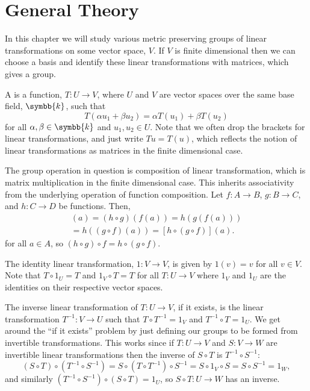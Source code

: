 \documentclass[fleqn]{NotesClass}
\newcommand{\ident}{1}
\renewcommand{\field}{\symbb{k}}
\begin{document}
    \section{General Theory}
    In this chapter we will study various metric preserving groups of linear transformations on some vector space, \(V\).
    If \(V\) is finite dimensional then we can choose a basis and identify these linear transformations with matrices, which gives a group.
    
    A  is a function, \(T \colon U \to V\), where \(U\) and \(V\) are vector spaces over the same base field, \(\field\), such that
    \begin{equation}
        T(\alpha u_1 + \beta u_2) = \alpha T(u_1) + \beta T(u_2)
    \end{equation}
    for all \(\alpha, \beta \in \field\) and \(u_1, u_2 \in U\).
    Note that we often drop the brackets for linear transformations, and just write \(Tu = T(u)\), which reflects the notion of linear transformations as matrices in the finite dimensional case.
    
    The group operation in question is composition of linear transformation, which is matrix multiplication in the finite dimensional case.
    This inherits associativity from the underlying operation of function composition.
    Let \(f \colon A \to B\), \(g \colon B \to C\), and \(h \colon C \to D\) be functions.
    Then,
    \begin{multline}
        [(h \circ g) \circ f](a) = (h \circ g)(f(a)) = h(g(f(a)))\\
        = h((g \circ f)(a)) = [h \circ (g \circ f)](a).
    \end{multline}
    for all \(a \in A\), so \((h \circ g) \circ f = h \circ (g \circ f)\).
    
    The identity linear transformation, \(\ident \colon V \to V\), is given by \(\ident(v) = v\) for all \(v \in V\).
    Note that \(T \circ \ident_U = T\) and \(\ident_V \circ T = T\) for all \(T \colon U \to V\) where \(\ident_V\) and \(\ident_U\) are the identities on their respective vector spaces.
    
    The inverse linear transformation of \(T \colon U \to V\), if it exists, is the linear transformation \(T^{-1}\colon V \to U\) such that \(T \circ T^{-1} = \ident_V\) and \(T^{-1} \circ T = \ident_U\).
    We get around the \enquote{if it exists} problem by just defining our groups to be formed from invertible transformations.
    This works since if \(T \colon U \to V\) and \(S \colon V \to W\) are invertible linear transformations then the inverse of \(S \circ T\) is \(T^{-1} \circ S^{-1}\):
    \begin{equation}
        (S \circ T) \circ (T^{-1} \circ S^{-1}) = S \circ (T \circ T^{-1}) \circ S^{-1} = S \circ \ident_V \circ S = S \circ S^{-1} = \ident_W,
    \end{equation}
    and similarly \((T^{-1} \circ S^{-1}) \circ (S \circ T) = \ident_U\), so \(S \circ T \colon U \to W\) has an inverse.
    
\end{document}
